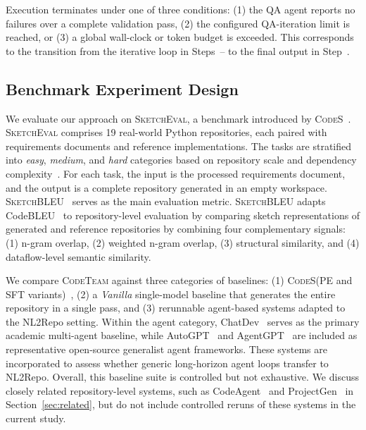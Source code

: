 \documentclass[format=acmsmall, review=false, screen=true]{acmart}
\newcommand{\tool}{\textsc{CodeTeam}\xspace}
\newcommand{\codes}{\textsc{CodeS}\xspace}
\newcommand{\sketcheval}{\textsc{SketchEval}\xspace}
\newcommand{\sketchbleu}{\textsc{SketchBLEU}\xspace}
\begin{document}
Execution terminates under one of three conditions: (1) the QA agent reports no failures over a complete validation pass, (2) the configured QA-iteration limit is reached, or (3) a global wall-clock or token budget is exceeded. This corresponds to the transition from the iterative loop in Steps~-- to the final output in Step~.


\subsection{Benchmark Experiment Design}
\label{subsec:benchmark}

We evaluate our approach on \sketcheval, a benchmark introduced by \codes~\cite{Zan2025CodeS}. \sketcheval comprises 19 real-world Python repositories, each paired with requirements documents and reference implementations. The tasks are stratified into \emph{easy}, \emph{medium}, and \emph{hard} categories based on repository scale and dependency complexity~\cite{Zan2025CodeS}. For each task, the input is the processed requirements document, and the output is a complete repository generated in an empty workspace. \sketchbleu~\cite{Zan2025CodeS} serves as the main evaluation metric.
\sketchbleu adapts CodeBLEU~\cite{Ren2020CodeBLEU} to repository-level evaluation by comparing sketch representations of generated and reference repositories by combining four complementary signals: (1) n-gram overlap, (2) weighted n-gram overlap, (3) structural similarity, and (4) dataflow-level semantic similarity.

We compare \tool against three categories of baselines: (1) \codes (PE and SFT variants)~\cite{Zan2025CodeS}, (2) a \emph{Vanilla} single-model baseline that generates the entire repository in a single pass, and (3) rerunnable agent-based systems adapted to the NL2Repo setting. Within the agent category, ChatDev~\cite{Qian2023ChatDev} serves as the primary academic multi-agent baseline, while AutoGPT~\cite{AutoGPT} and AgentGPT~\cite{AgentGPT} are included as representative open-source generalist agent frameworks. These systems are incorporated to assess whether generic long-horizon agent loops transfer to NL2Repo. Overall, this baseline suite is controlled but not exhaustive. We discuss closely related repository-level systems, such as CodeAgent~\cite{Zhang2024CodeAgent} and ProjectGen~\cite{Zhao2025ProjectGen} in Section~\ref{sec:related}, but do not include controlled reruns of these systems in the current study.
\end{document}
